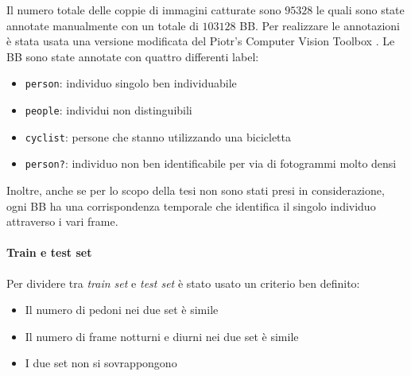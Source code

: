 Il numero totale delle coppie di immagini catturate sono $95328$ le quali sono state annotate manualmente con un totale di $103128$ \ac{BB}. Per realizzare le annotazioni è stata usata una versione modificata del Piotr's Computer Vision Toolbox \cite{PMT}. Le \ac{BB} sono state annotate con quattro differenti label:
\begin{itemize}
    \item \texttt{person}: individuo singolo ben individuabile
    \item \texttt{people}: individui non distinguibili
    \item \texttt{cyclist}: persone che stanno utilizzando una bicicletta
    \item \texttt{person?}: individuo non ben identificabile per via di fotogrammi molto densi
\end{itemize}
Inoltre, anche se per lo scopo della tesi non sono stati presi in considerazione, ogni \ac{BB} ha una corrispondenza temporale che identifica il singolo individuo attraverso i vari frame.
\paragraph{Train e test set}
Per dividere tra \textit{train set} e \textit{test set} è stato usato un criterio ben definito:
\begin{itemize}
    \item Il numero di pedoni nei due set è simile
    \item Il numero di frame notturni e diurni nei due set è simile
    \item I due set non si sovrappongono
\end{itemize}
